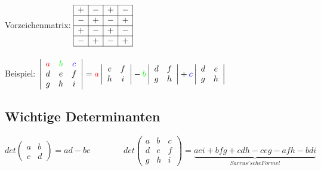 	Vorzeichenmatrix: $\begin{array}{|c|c|c|c|}
		\hline + & - & + & - \\
		\hline - & + & - & + \\
		\hline + & - & + & - \\
		\hline - & + & - & + \\
		\hline \end{array}$ \\ \\

	Beispiel: $\left|\begin{array}{ccc}
		\color{red}a & \color{green}b & \color{blue}c \\
		d & e & f \\
		g & h & i \end{array}\right| 
	= {\color{red}a} \left|\begin{array}{cc}
		e & f \\
		h & i \end{array}\right| 
	- {\color{green}b} \left|\begin{array}{cc}
		d & f \\
		g & h \end{array}\right|
	+ {\color{blue}c} \left|\begin{array}{cc}
		d & e \\
		g & h \end{array}\right|$ \\

\subsection{Wichtige Determinanten}
	$det\left(\begin{array}{cc}
		a & b \\
		c & d \end{array}\right)
	= ad - bc \qquad \qquad
	det\left(\begin{array}{ccc}
		a & b & c \\
		d & e & f \\
		g & h & i \end{array}\right)
	= \underbrace{aei + bfg + cdh - ceg - afh - bdi}_{Sarrus'sche Formel}$

